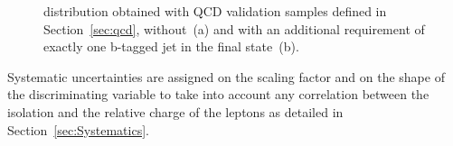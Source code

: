 \begin{figure}[tp]
	\begin{center}
	     
	
	\end{center}
	\caption{\mmc distribution obtained with QCD validation samples 
	defined in Section~\ref{sec:qcd}, without~(a) and with an additional requirement of exactly one b-tagged jet in the final state~(b).}
	\label{fig:ABCD_cr}
\end{figure}


Systematic uncertainties are assigned on the scaling factor \rqcd and on the shape of
the discriminating variable \mmc to take into account any correlation between the isolation and the relative charge 
of the leptons as detailed in Section~\ref{sec:Systematics}.





